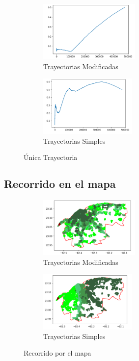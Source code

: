 \begin{figure}[h!]
	\centering
	\begin{subfigure}[b]{0.49\linewidth}
		\includegraphics[width=\linewidth, height=3cm]{Images/OneTrayecV.png}
		\caption{Trayectorias Modificadas}
		\label{fig:OnetrayectoriasM}
	\end{subfigure}
	\begin{subfigure}[b]{0.49\linewidth}
		\includegraphics[width=\linewidth, height=3cm]{Images/OneTrayecD.png}
		\caption{Trayectorias Simples}
		\label{fig:OnetrayectoriasS}
	\end{subfigure}
	
	\caption{Única Trayectoria}
	\label{fig:Onetrayectorias}
\end{figure}

\subsection{Recorrido en el mapa }

\begin{figure}[h!]
	\centering
	\begin{subfigure}[b]{0.49\linewidth}
		\includegraphics[width=\linewidth, height=3cm]{Images/TrayecVa.png}
		\caption{Trayectorias Modificadas}
		\label{fig:TrayecVa}
	\end{subfigure}
	\begin{subfigure}[b]{0.49\linewidth}
		\includegraphics[width=\linewidth, height=3cm]{Images/TrayecDis.png}
		\caption{Trayectorias Simples}
		\label{fig:TrayecDis}
	\end{subfigure}
	
	\caption{Recorrido por el mapa}
	\label{fig:RecorridoTrayectorias}
\end{figure}

